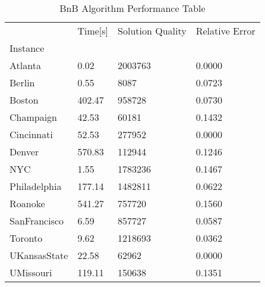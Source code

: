 \begin{table}
\caption{ BnB Algorithm Performance Table }
\begin{tabular}{llll}
\toprule
{} & Time[s] & Solution Quality & Relative Error \\
Instance     &         &                  &                \\
\midrule
Atlanta      &    0.02 &          2003763 &         0.0000 \\
Berlin       &    0.55 &             8087 &         0.0723 \\
Boston       &  402.47 &           958728 &         0.0730 \\
Champaign    &   42.53 &            60181 &         0.1432 \\
Cincinnati   &   52.53 &           277952 &         0.0000 \\
Denver       &  570.83 &           112944 &         0.1246 \\
NYC          &    1.55 &          1783236 &         0.1467 \\
Philadelphia &  177.14 &          1482811 &         0.0622 \\
Roanoke      &  541.27 &           757720 &         0.1560 \\
SanFrancisco &    6.59 &           857727 &         0.0587 \\
Toronto      &    9.62 &          1218693 &         0.0362 \\
UKansasState &   22.58 &            62962 &         0.0000 \\
UMissouri    &  119.11 &           150638 &         0.1351 \\
\bottomrule
\end{tabular}
\end{table}

